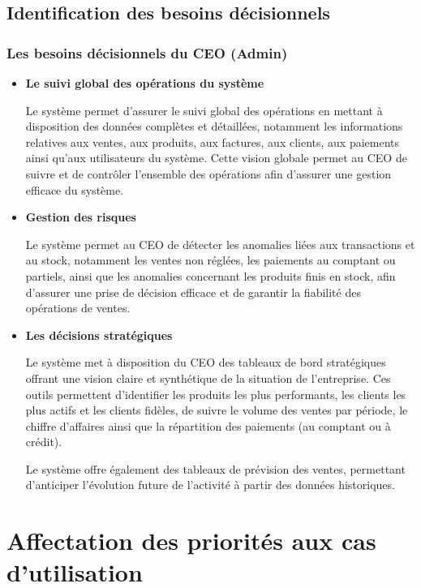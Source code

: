\subsection{Identification des besoins décisionnels}
\label{sec:ch2:decisionnels}

\subsubsection*{Les besoins décisionnels du CEO (Admin)}

\begin{itemize}

\item \textbf{Le suivi global des opérations du système}

Le système permet d'assurer le suivi global des opérations en mettant à disposition des données complètes et détaillées, notamment les informations relatives aux ventes, aux produits, aux factures, aux clients, aux paiements ainsi qu'aux utilisateurs du système. Cette vision globale permet au CEO de suivre et de contrôler l'ensemble des opérations afin d'assurer une gestion efficace du système.

\item \textbf{Gestion des risques}

Le système permet au CEO de détecter les anomalies liées aux transactions et au stock, notamment les ventes non réglées, les paiements au comptant ou partiels, ainsi que les anomalies concernant les produits finis en stock, afin d'assurer une prise de décision efficace et de garantir la fiabilité des opérations de ventes.

\item \textbf{Les décisions stratégiques}

Le système met à disposition du CEO des tableaux de bord stratégiques offrant une vision claire et synthétique de la situation de l'entreprise. Ces outils permettent d'identifier les produits les plus performants, les clients les plus actifs et les clients fidèles, de suivre le volume des ventes par période, le chiffre d'affaires ainsi que la répartition des paiements (au comptant ou à crédit).

Le système offre également des tableaux de prévision des ventes, permettant d'anticiper l'évolution future de l'activité à partir des données historiques.

\end{itemize}
\newpage

\section{Affectation des priorités aux cas d'utilisation}

